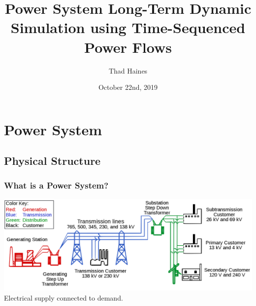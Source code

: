 \documentclass[14pt, unknownkeysallowed]{beamer}
\title{Power System Long-Term Dynamic Simulation using Time-Sequenced \\Power Flows}
\author{Thad Haines}
\institute[MT TECH]{Montana Technological University - Master's Thesis Research Project}
\date{October 22nd, 2019}
\begin{document}
	
\begin{frame}
	\titlepage
\end{frame}

\section{Power System}
\subsection{Physical Structure}
\begin{frame}
\frametitle{What is a Power System?}
\includegraphics[width=\linewidth]{largeGrid}{\tiny \cite{powersystemSVG} } %
Electrical supply connected to demand.\\
\end{frame}
\end{document}
